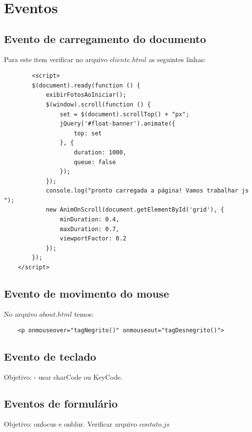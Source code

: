 \section{Eventos}

\subsection{Evento de carregamento do documento}
	Para este item verificar no arquivo $cliente.html$ as seguintes linhas:
	\begin{lstlisting}
	    <script>
        $(document).ready(function () {
            exibirFotosAoIniciar();
            $(window).scroll(function () {
                set = $(document).scrollTop() + "px";
                jQuery('#float-banner').animate({
                    top: set
                }, {
                    duration: 1000,
                    queue: false
                });
            });
            console.log("pronto carregada a página! Vamos trabalhar js ");
            new AnimOnScroll(document.getElementById('grid'), {
                minDuration: 0.4,
                maxDuration: 0.7,
                viewportFactor: 0.2
            });
        });
    </script>
	\end{lstlisting}
\subsection{Evento de movimento do mouse}
	No arquivo $about.html$ temos:
\begin{lstlisting}
	<p onmouseover="tagNegrito()" onmouseout="tagDesnegrito()">
\end{lstlisting}
\subsection{Evento de teclado}
 Objetivo:  - usar charCode ou KeyCode.
 
 
\subsection{Eventos de formulário}
	Objetivo: onfocus e onblur. Verificar arquivo $contato.js$
	
